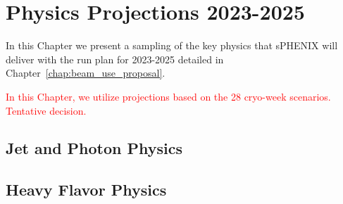\chapter{Physics Projections 2023-2025}
\label{chap:physics_projections}

In this Chapter we present a sampling of the key physics that sPHENIX will deliver with the run plan for 2023-2025 detailed in Chapter~\ref{chap:beam_use_proposal}.    

{\textcolor{red}{In this Chapter, we utilize projections based on the 28 cryo-week scenarios.   Tentative decision.}}

\section{Jet and Photon Physics}

\section{Heavy Flavor Physics}
\label{sec:HF}



